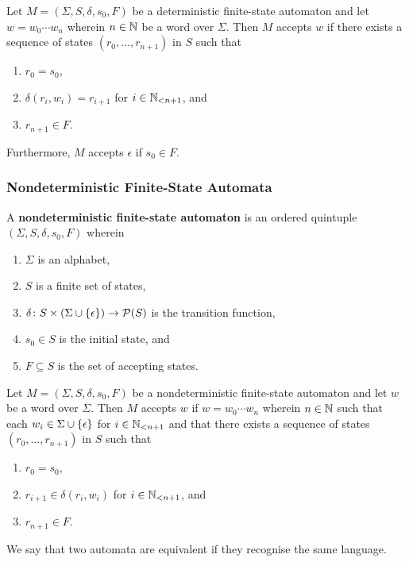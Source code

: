 Let \(M = (\Sigma, S, \delta, s_0, F)\) be a deterministic finite-state
automaton and let \(w = w_0 \cdots w_n\) wherein \(n \in \setnat\) be a word
over \(\Sigma\).  Then \(M\) accepts \(w\) if there exists a sequence of states
\((r_0, \ldots, r_{n + 1})\) in \(S\) such that
\begin{enumerate}
    \item \(r_0 = s_0\),
    \item \(\delta(r_i, w_i) = r_{i + 1}\) for \(i \in \Nln[n + 1]\), and
    \item \(r_{n + 1} \in F\).
\end{enumerate}
Furthermore, \(M\) accepts \(\epsilon\) if \(s_0 \in F\).

\subsubsection{Nondeterministic Finite-State Automata}

\Bdf
    A {\bf nondeterministic finite-state automaton} is an ordered quintuple
    \((\Sigma, S, \delta, s_0, F)\) wherein
    \begin{enumerate}
        \item \(\Sigma\) is an alphabet,
        \item \(S\) is a finite set of states,
        \item \(\map{\delta}{S \times (\Sigma \cup \set{\epsilon})}{\pow(S)}\)
        is the transition function,
        \item \(s_0 \in S\) is the initial state, and
        \item \(F \subseteq S\) is the set of accepting states.
    \end{enumerate}
\Edf

Let \(M = (\Sigma, S, \delta, s_0, F)\) be a nondeterministic finite-state
automaton and let \(w\) be a word over \(\Sigma\). Then \(M\) accepts \(w\) if
\(w = w_0 \cdots w_n\) wherein \(n \in \setnat\) such that each \(w_i \in \Sigma
\cup \set{\epsilon}\) for \(i \in \Nln[n + 1]\) and that there exists a sequence
of states \((r_0, \ldots, r_{n + 1})\) in \(S\) such that
\begin{enumerate}
    \item \(r_0 = s_0\),
    \item \(r_{i + 1} \in \delta(r_i, w_i)\) for \(i \in \Nln[n + 1]\), and
    \item \(r_{n + 1} \in F\).
\end{enumerate}

We say that two automata are equivalent if they recognise the same language.

